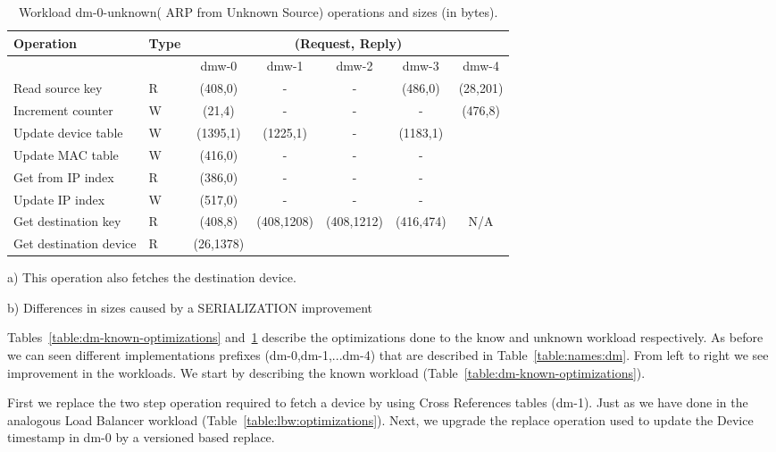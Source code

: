 \begin{table}[ht]
\small
\centering 
\begin{threeparttable}
\begin{tabular}{ll ccccc}
 Operation & Type &  \multicolumn{5}{c}{ (Request, Reply) } \\  \midrule
&  & dmw-0 & dmw-1  & dmw-2 & dmw-3 & dmw-4 \\ \toprule 
Read source key & R & (408,0) & - & - & (486,0) & (28,201)\tnote{a}\\
Increment counter & W & (21,4) & -  & - & - & \multirow{5}{*}{(476,8)} \\
Update device table & W & (1395,1) & (1225,1)\tnote{b}  & - &
(1183,1) & \\
Update MAC  table & W & (416,0) & - & - & -
& \\
Get from IP index & R & (386,0) & - & - & - & \\
Update IP index  & W & (517,0) & - & - & - & \\
Get destination key & R & (408,8) &
\multirow{2}{*}{(408,1208)}\tnote{b} & \multirow{2}{*}{(408,1212)} &
\multirow{2}{*}{(416,474)} & \multirow{2}{*}{N/A}  \\ 
Get destination device & R & (26,1378)  &  & & \\\bottomrule
\end{tabular}
\caption[Workload dm-0-unknown( ARP from Unknown Source)
operations]{Workload dm-0-unknown( ARP from Unknown Source) operations
  and sizes (in bytes).}\label{table:dm-unknown-optimizations}
\begin{tablenotes}
\item [a)] This operation also fetches the destination device.
\item [b)] Differences in sizes caused by a SERIALIZATION improvement 
\end{tablenotes}
\end{threeparttable}
\end{table}

Tables~\ref{table:dm-known-optimizations} and~\ref{table:dm-unknown-optimizations} describe the optimizations done to the know and unknown workload respectively. 
As before we can seen different implementations prefixes (dm-0,dm-1,...dm-4) that are described in Table~\ref{table:names:dm}. 
From left to right we see improvement in the workloads. 
We start by describing the known workload (Table~\ref{table:dm-known-optimizations}). 

First we replace the two step operation required to fetch a device by
using Cross References tables (dm-1). 
Just as we have done in the analogous Load Balancer workload (Table~\ref{table:lbw:optimizations}). 
Next, we upgrade  the replace operation used to update the Device timestamp in dm-0 by a versioned based replace. 

